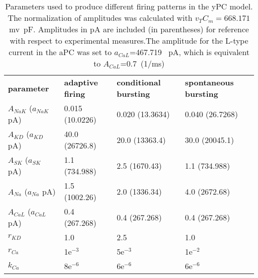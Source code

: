 \documentclass[10pt]{article}
\begin{document}
\begin{table}[h!]
\centering
 \caption{Parameters used to produce different firing patterns in the yPC model. The normalization of amplitudes was calculated with $v_T C_m=668.171$ mv~pF. Amplitudes in pA are included (in parentheses) for reference with respect to experimental measures.The amplitude for the L-type \calcium current in the aPC was set to $a_{CaL}$=467.719~ pA, which is equivalent to $A_{CaL}$=0.7~(1/ms)} 
\begin{footnotesize}
\begin{tabular}{p{5em} p{5em}  p{5em}  p{5em}} %
\textbf{parameter} & \textbf{adaptive \newline firing} & \textbf{conditional bursting} & \textbf{spontaneous bursting} \\
$A_{NaK}$ ($a_{NaK}$ pA)& 0.015 (10.0226) & 0.020 (13.3634)& 0.040 (26.7268)\\
$A_{KD}$ ($a_{KD}$ pA)& 40.0 (26726.8)& 20.0 (13363.4)& 30.0 (20045.1)\\
$A_{SK}$ ($a_{SK}$ pA)& 1.1 (734.988)& 2.5 (1670.43) & 1.1 (734.988)\\
$A_{Na}$ ($a_{Na}$ pA) & 1.5 (1002.26) & 2.0 (1336.34)& 4.0 (2672.68)\\
$A_{CaL}$ ($a_{CaL}$ pA)& 0.4 (267.268) & 0.4 (267.268)& 0.4 (267.268)\\
$r_{KD}$ & 1.0 & 2.5 & 1.0 \\
$r_{Ca}$ & 1e$^{-3}$ & 5e$^{-3}$ & 1e$^{-2}$ \\
$k_{Ca}$ & 8e$^{-6}$ & 6e$^{-6}$ & 6e$^{-6}$ \\
\end{tabular}
\label{tab:regimes}
\end{footnotesize}
\end{table}




\end{document}
